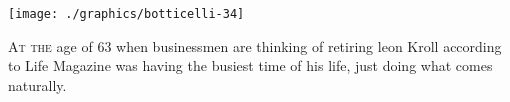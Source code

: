     \begin{leftcolumn}
       \texttt{[image: ./graphics/botticelli-34]}\par
   \end{leftcolumn}
   \begin{rightcolumn}
       \par
       \tinyskip
       \par
      \begin{multicols}{2}
      \small
      \lettrine{A}{t the} age of 63 when businessmen are thinking of retiring leon Kroll according to Life Magazine was having the busiest time of his life, just doing what comes naturally.  \lorem\lorem
      \end{multicols}
    \end{rightcolumn}
\stoptemplate
